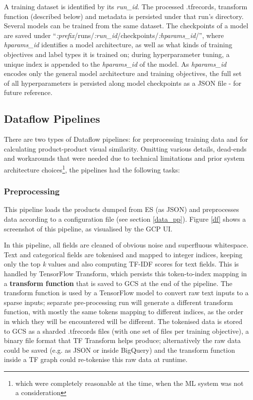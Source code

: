 A training dataset is identified by its \textit{run\_id}.
The processed .tfrecords, transform function (described below) and metadata is persisted under that run's directory.
Several models can be trained from the same dataset.
The checkpoints of a model are saved under ``\textit{:prefix}/runs/\textit{:run\_id}/checkpoints/\textit{:hparams\_id}/'', where \textit{hparams\_id} identifies a model architecture, as well as what kinds of training objectives and label types it is trained on; during hyperparameter tuning, a unique index is appended to the \textit{hparams\_id} of the model.
As \textit{hparams\_id} encodes only the general model architecture and training objectives, the full set of all hyperparameters is persisted along model checkpoints as a JSON file - for future reference.

\subsection{Dataflow Pipelines}
There are two types of Dataflow pipelines: for preprocessing training data and for calculating product-product visual similarity. Omitting various details, dead-ends and workarounds that were needed due to technical limitations and prior system architecture choices\footnote{which were completely reasonable at the time, when the ML system was not a consideration}, the pipelines had the following tasks:

\subsubsection{Preprocessing}
\label{pp}

This pipeline loads the products dumped from ES (as JSON) and preprocesses data according to a configuration file (see section \ref{data_pp}).
Figure \ref{df} shows a screenshot of this pipeline, as visualised by the GCP UI.

In this pipeline, all fields are cleaned of obvious noise and superfluous whitespace.
Text and categorical fields are tokenised and mapped to integer indices, keeping only the top \textit{k} values and also computing TF-IDF scores for text fields.
This is handled by TensorFlow Transform, which persists this token-to-index mapping in a \textbf{transform function} that is saved to GCS at the end of the pipeline.
The transform function is used by a TensorFlow model to convert raw text inputs to a  sparse inputs;
separate pre-processing run will generate a different transform function, with mostly the same tokens mapping to different indices, as the order in which they will be encountered will be different.
The tokenised data is stored to GCS as a sharded .tfrecords files (with one set of files per training objective), a binary file format that TF Transform helps produce; alternatively the raw data could be saved (e.g. as JSON or inside BigQuery) and the transform function inside a TF graph could re-tokenise this raw data at runtime.

